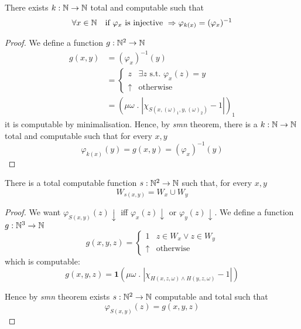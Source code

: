 \begin{proposition}
  There exists $k: \mathbb{N} \to \mathbb{N}$ total and computable such that
\[\forall x \in \mathbb{N} \quad \mbox{if } \varphi_x \mbox{ is injective }
  \Rightarrow \varphi_{k(x)} = (\varphi_x)^{-1}\]
\begin{proof}
  We define a function $g : \mathbb{N}^2 \to \mathbb{N}$
  \begin{align*}
    g(x,y) &= (\varphi_x)^{-1}(y) \\
           &= \begin{cases}
      z & \exists z \mbox{ s.t. } \varphi_x(z) = y \\
      \uparrow & \mbox{otherwise}
    \end{cases}\\
    & = (\mu \omega \; . \; |\chi_{S(x, (\omega)_1, y, (\omega)_2)} - 1|)_1
  \end{align*}
  it is computable by minimalisation.
  Hence, by \emph{smn} theorem, there is a $k: \mathbb{N} \to \mathbb{N}$ total and
  computable such that for every $x,y$
  \[\varphi_{k(x)}(y) = g(x,y) = (\varphi_x)^{-1}(y)\]
\end{proof}
\end{proposition}


\begin{proposition}
  There is a total computable function $s : \mathbb{N}^2 \rightarrow \mathbb{N}$
such that, for every $x, y$
 \[W_{s(x,y)} = W_x \cup W_y\]
\begin{proof}
  We want $\varphi_{S(x,y)}(z)\downarrow$ iff
  $\varphi_x(z)\downarrow$ or $\varphi_y(z) \downarrow$. We define
  a function $g : \mathbb{N}^3 \to \mathbb{N}$
  \[
    g(x,y,z) = \begin{cases}
      1 & z \in W_x \vee z \in W_y \\
      \uparrow  & \mbox{otherwise}
    \end{cases}
  \]
  which is computable:
  \[
    g(x,y,z) = \mathbf{1}(\mu \omega \; . \; |\chi_{H(x,z,\omega)
      \wedge H(y,z,\omega)} - 1|)
  \]
  

  Hence by \emph{smn} theorem exists $s:\mathbb{N}^2 \rightarrow \mathbb{N}$
  computable and total such that \[\varphi_{S(x,y)}(z) = g(x,y,z)\]
\end{proof}
\end{proposition}

